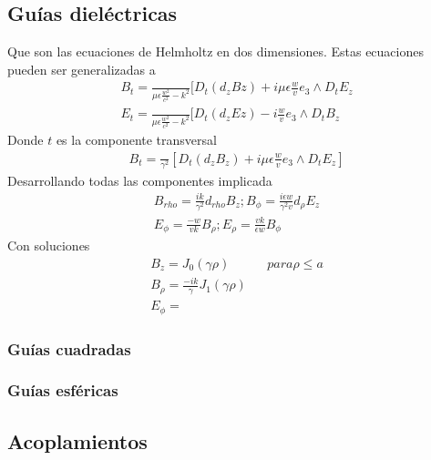 \subsection{Guías dieléctricas}
Que son las ecuaciones de Helmholtz en dos dimensiones. Estas ecuaciones pueden ser generalizadas a
\begin{subequations}
	\begin{align}
	B_{t}=\frac{}{\mu \epsilon\frac{w^2}{c^2}-k^2}[D_{t} (d_{z} B{z})+i\mu\epsilon\frac{w}{v}e_{3}\wedge D_{t}E_{z} \\
	E_{t}=\frac{}{\mu \epsilon\frac{w^2}{c^2}-k^2}[D_{t} (d_{z} E{z})-i\frac{w}{v}e_{3}\wedge D_{t}B_{z} 
	\end{align}
	\end{subequations}
Donde $t$ es la componente transversal
\begin{subequations}
	\begin{align}
	B_{t}=\frac{}{\gamma^2} [D_{t}(d_{z}B_{z})+i\mu \epsilon \frac{w}{v} e_{3}\wedge D_{t}E_{z}]
	\end{align}
\end{subequations}
Desarrollando todas las componentes implicada
\begin{subequations}
	\begin{align}
B_{rho} = \frac{ik}{\gamma^2}d_{rho}B_{z} ; B_{\phi} = \frac{i \epsilon w}{\gamma^2 v} d_{\rho} E_{z}\\
E_{\phi} = \frac{-w}{v k }B_{\rho} ; E_{\rho} = \frac{v k}{\epsilon w} B_{\phi}
	\end{align}
\end{subequations}
Con soluciones 
\begin{subequations}
	\begin{gather}
		B_{z} = J_{0}(\gamma \rho) && para \rho \leq a \nonumber \\
		B_{\rho } = \frac{-i k}{\gamma} J_{1} (\gamma \rho) \nonumber \\
		E_{\phi} =
	\end{gather}
\end{subequations}
\subsubsection{Guías cuadradas}
\subsubsection{Guías esféricas}
\subsection{Acoplamientos}